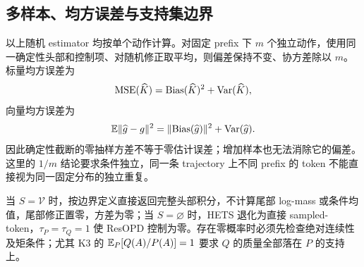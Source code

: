 \subsection{多样本、均方误差与支持集边界}

以上随机 estimator 均按单个动作计算。对固定 prefix 下 $m$ 个独立动作，使用同一确定性头部和控制项、对随机修正取平均，则偏差保持不变、协方差除以 $m$。标量均方误差为
\begin{equation*}
 \operatorname{MSE}(\widehat K)=\operatorname{Bias}(\widehat K)^2+\operatorname{Var}(\widehat K),
\end{equation*}
向量均方误差为
\begin{equation*}
 \mathbb E\lVert\widehat g-g\rVert^2
 =\lVert\operatorname{Bias}(\widehat g)\rVert^2+\operatorname{Var}(\widehat g).
\end{equation*}
因此确定性截断的零抽样方差不等于零估计误差；增加样本也无法消除它的偏差。这里的 $1/m$ 结论要求条件独立，同一条 trajectory 上不同 prefix 的 token 不能直接视为同一固定分布的独立重复。

当 $S=\mathcal V$ 时，按边界定义直接返回完整头部积分，不计算尾部 log-mass 或条件均值，尾部修正置零，方差为零；当 $S=\varnothing$ 时，HETS 退化为直接 sampled-token，$\tau_P=\tau_Q=1$ 使 ResOPD 控制为零。存在零概率时必须先检查绝对连续性及矩条件；尤其 K3 的 $\mathbb E_P[Q(A)/P(A)]=1$ 要求 $Q$ 的质量全部落在 $P$ 的支持上。
